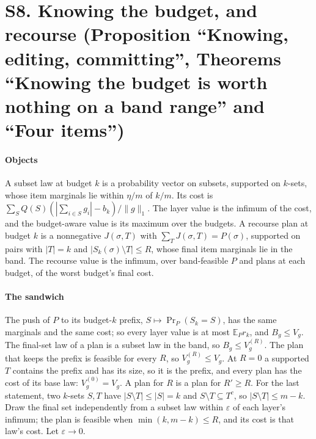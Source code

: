 \section{S8. Knowing the budget, and recourse (Proposition ``Knowing, editing, committing'',
Theorems ``Knowing the budget is worth nothing on a band range'' and ``Four items'')}

\paragraph{Objects} A subset law at budget $k$ is a probability vector on subsets, supported on
$k$-sets, whose item marginals lie within $\eta/m$ of $k/m$. Its cost is
$\sum_SQ(S)(|\sum_{i\in S}g_i|-b_k)/\|g\|_1$. The layer value is the infimum of the cost, and the
budget-aware value is its maximum over the budgets. A recourse plan at budget $k$ is a
nonnegative $J(\sigma,T)$ with $\sum_TJ(\sigma,T)=P(\sigma)$, supported on pairs with $|T|=k$ and
$|S_k(\sigma)\setminus T|\le R$, whose final item marginals lie in the band. The recourse value
is the infimum, over band-feasible $P$ and plans at each budget, of the worst budget's final cost.

\paragraph{The sandwich} The push of $P$ to its budget-$k$ prefix, $S\mapsto\Pr_P(S_k=S)$, has the
same marginals and the same cost; so every layer value is at most $\mathbb E_Pr_k$, and
$B_g\le V_g$. The final-set law of a plan is a subset law in the band, so $B_g\le V^{(R)}_g$. The
plan that keeps the prefix is feasible for every $R$, so $V^{(R)}_g\le V_g$. At $R=0$ a
supported $T$ contains the prefix and has its size, so it is the prefix, and every plan has the
cost of its base law: $V^{(0)}_g=V_g$. A plan for $R$ is a plan for $R'\ge R$. For the last
statement, two $k$-sets $S,T$ have $|S\setminus T|\le|S|=k$ and $S\setminus T\subseteq T^{c}$,
so $|S\setminus T|\le m-k$. Draw the final set independently from a subset law within
$\varepsilon$ of each layer's infimum; the plan is feasible when $\min(k,m-k)\le R$, and its
cost is that law's cost. Let $\varepsilon\to0$.

